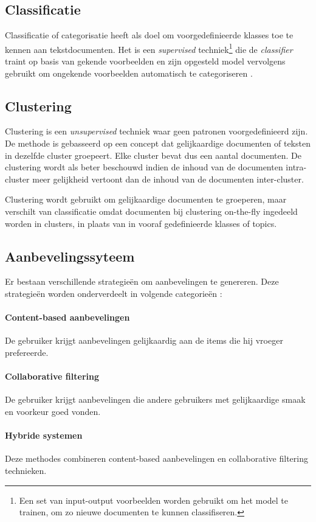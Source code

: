 \subsection{Classificatie}\label{classificatie}
Classificatie of categorisatie heeft als doel om voorgedefinieerde klasses toe te kennen aan tekstdocumenten. Het is een \textit{supervised} techniek\footnote{Een set van input-output voorbeelden worden gebruikt om het model te trainen, om zo nieuwe documenten te kunnen classifiseren.} die de \textit{classifier} traint op basis van gekende voorbeelden en zijn opgesteld model vervolgens gebruikt om ongekende voorbeelden automatisch te categoriseren \cite{Nasa2012}. 



\subsection{Clustering}\label{clustering}
Clustering is een \textit{unsupervised} techniek waar geen patronen voorgedefinieerd zijn. De methode is gebasseerd op een concept dat gelijkaardige documenten of teksten in dezelfde cluster groepeert. Elke cluster bevat dus een aantal documenten. De clustering wordt als beter beschouwd indien de inhoud van de documenten intra-cluster meer gelijkheid vertoont dan de inhoud van de documenten inter-cluster.

Clustering wordt gebruikt om gelijkaardige documenten te groeperen, maar verschilt van classificatie omdat documenten bij clustering on-the-fly ingedeeld worden in clusters, in plaats van in vooraf gedefinieerde klasses of topics.

\subsection{Aanbevelingssyteem}
Er bestaan verschillende strategie\"en om aanbevelingen te genereren. Deze strategie\"en worden onderverdeelt in volgende categorie\"en \cite{Adomavicius2005}: 
\paragraph{Content-based aanbevelingen}
De gebruiker krijgt aanbevelingen gelijkaardig aan de items die hij vroeger prefereerde.
\paragraph{Collaborative filtering}
De gebruiker krijgt aanbevelingen die andere gebruikers met gelijkaardige smaak en voorkeur goed vonden.
\paragraph{Hybride systemen}
Deze methodes combineren content-based aanbevelingen en collaborative filtering technieken.